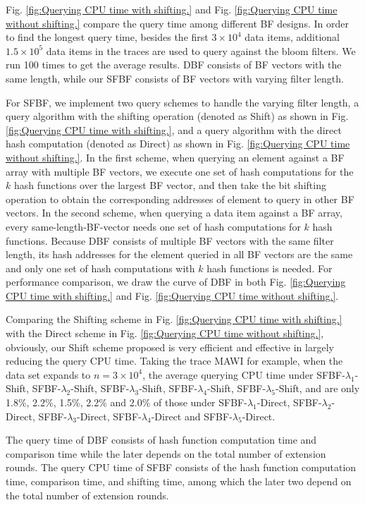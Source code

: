 \documentclass[10pt,journal,compsoc]{IEEEtran}
\begin{document}
Fig. \ref{fig:Querying CPU time with shifting.} and Fig. \ref{fig:Querying CPU time without shifting.} compare the query time among different BF designs. In order to find the longest query time, besides the first $3 \times 10^4$ data items, additional $1.5 \times 10^5$ data items in the traces are used to query against the bloom filters. We run 100 times to get the average results. DBF consists of BF vectors with the same length, while our SFBF consists of BF vectors with varying filter length.

For SFBF, we implement two query schemes to handle the varying filter length, a query algorithm with the shifting operation (denoted as Shift) as shown in Fig. \ref{fig:Querying CPU time with shifting.}, and a query algorithm with the direct hash computation (denoted as Direct) as shown in Fig. \ref{fig:Querying CPU time without shifting.}. In the first scheme, when querying an element against a BF array with multiple BF vectors, we execute one set of hash computations for the $k$ hash functions over the largest BF vector, and then take the bit shifting operation to obtain the corresponding addresses of element to query in other BF vectors. In the second scheme, when querying a data item against a BF array, every same-length-BF-vector needs one set of hash computations for $k$ hash functions. Because DBF consists of multiple BF vectors with the same filter length, its  hash addresses for the element queried in all BF vectors are the same and only one set of hash computations with $k$ hash functions is needed. For performance comparison, we draw the curve of DBF in both Fig. \ref{fig:Querying CPU time with shifting.} and Fig. \ref{fig:Querying CPU time without shifting.}.


 Comparing the Shifting scheme in Fig. \ref{fig:Querying CPU time with shifting.}  with the Direct scheme in Fig. \ref{fig:Querying CPU time without shifting.}, obviously, our Shift scheme proposed is very efficient and effective in largely reducing the query CPU time. Taking the trace MAWI for example, when the data set expands to $n = 3 \times 10^4$, the average querying CPU time under SFBF-$\lambda_1$-Shift, SFBF-$\lambda_2$-Shift, SFBF-$\lambda_3$-Shift, SFBF-$\lambda_4$-Shift, SFBF-$\lambda_5$-Shift, and are only 1.8\%, 2.2\%, 1.5\%, 2.2\% and 2.0\% of those under SFBF-$\lambda_1$-Direct, SFBF-$\lambda_2$-Direct, SFBF-$\lambda_3$-Direct, SFBF-$\lambda_4$-Direct and SFBF-$\lambda_5$-Direct.

The query time of DBF consists of hash function computation time and comparison time while the later depends on the total number of extension rounds. The query CPU time of SFBF consists of the hash function computation time, comparison time, and shifting time, among which the later two depend on the total number of extension rounds.
\end{document}
